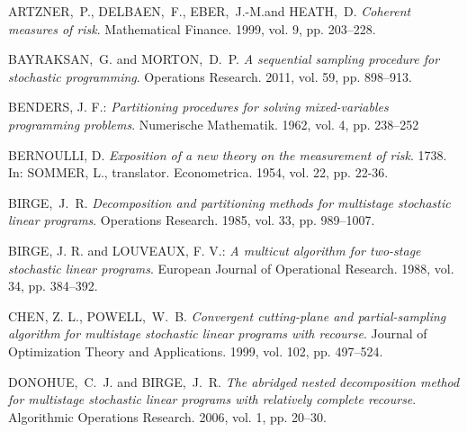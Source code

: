 \documentclass{article}              %
\newcommand{\refauthor}[1]{\uppercase{#1}}
\newcommand{\reftitle}[1]{\emph{#1}}
\newcommand{\refyear}[1]{#1}
\newcommand{\refvolume}[1]{vol. #1}
\newcommand{\refissue}[1]{iss. #1}
\newcommand{\refjournal}[1]{#1}
\newcommand{\refpages}[1]{pp. #1}
\begin{document}
\def\bibname{Bibliography}
\begin{thebibliography}{99}
\addcontentsline{toc}{chapter}{\bibname}



 \refauthor{Artzner,~P.}, \refauthor{Delbaen,~F.}, \refauthor{Eber,~J.-M.}and \refauthor{Heath,~D.} \reftitle{Coherent measures of risk}. \refjournal{Mathematical Finance}. \refyear{1999}, \refvolume{9}, \refpages{203--228}.

\refauthor{Bayraksan,~G.} and \refauthor{Morton,~D.~P.} \reftitle{A sequential sampling procedure for stochastic programming}. \refjournal{Operations Research}. \refyear{2011}, \refvolume{59}, \refpages{898--913}.

\refauthor{Benders, J. F.}: \reftitle{Partitioning procedures for solving mixed-variables programming problems}. \refjournal{Numerische Mathematik}. \refyear{1962}, \refvolume{4}, \refpages{238--252}

 \refauthor{Bernoulli, D.} \reftitle{Exposition of a new theory on the measurement of risk}. \refyear{1738}. In: \refauthor{Sommer, L.}, translator. \refjournal{Econometrica}. \refyear{1954}, \refvolume{22}, \refpages{22-36}.

 \refauthor{Birge,~J.~R.} \reftitle{Decomposition and partitioning methods for multistage stochastic linear programs}. \refjournal{Operations Research}. \refyear{1985}, \refvolume{33}, \refpages{989--1007}.

\refauthor{Birge, J. R.} and \refauthor{Louveaux, F. V.}: \reftitle{A multicut algorithm for two-stage stochastic linear programs}. \refjournal{European Journal of Operational Research}. \refyear{1988}, \refvolume{34}, \refpages{384--392}.

 \refauthor{Chen, Z. L.}, \refauthor{Powell,~W.~B.} \reftitle{Convergent cutting-plane and partial-sampling algorithm for multistage stochastic linear programs with recourse}. \refjournal{Journal of Optimization Theory and Applications}. \refyear{1999}, \refvolume{102}, \refpages{497--524}.

 \refauthor{Donohue,~C.~J.} and \refauthor{Birge,~J.~R.} \reftitle{The abridged nested decomposition method for multistage stochastic linear programs with relatively complete recourse}. \refjournal{Algorithmic Operations Research}.  \refyear{2006}, \refvolume{1}, \refpages{20--30}.



\end{thebibliography}
\end{document}
